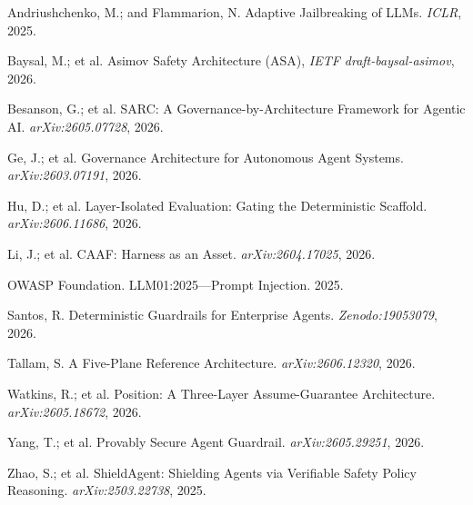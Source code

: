 \documentclass[letterpaper]{article} %
\begin{document}
\begin{thebibliography}{}

Andriushchenko, M.; and Flammarion, N.
Adaptive Jailbreaking of LLMs.  {\em ICLR}, 2025.

Baysal, M.; et al.
Asimov Safety Architecture (ASA), {\em IETF draft-baysal-asimov}, 2026.

Besanson, G.; et al.
SARC: A Governance-by-Architecture Framework for Agentic AI.
{\em arXiv:2605.07728}, 2026.

Ge, J.; et al.
Governance Architecture for Autonomous Agent Systems.
{\em arXiv:2603.07191}, 2026.

Hu, D.; et al.
Layer-Isolated Evaluation: Gating the Deterministic Scaffold.
{\em arXiv:2606.11686}, 2026.

Li, J.; et al.
CAAF: Harness as an Asset.  {\em arXiv:2604.17025}, 2026.

OWASP Foundation.  LLM01:2025---Prompt Injection.  2025.

Santos, R.  Deterministic Guardrails for Enterprise Agents.
{\em Zenodo:19053079}, 2026.

Tallam, S.  A Five-Plane Reference Architecture.
{\em arXiv:2606.12320}, 2026.

Watkins, R.; et al.
Position: A Three-Layer Assume-Guarantee Architecture.
{\em arXiv:2605.18672}, 2026.

Yang, T.; et al.
Provably Secure Agent Guardrail.  {\em arXiv:2605.29251}, 2026.

Zhao, S.; et al.
ShieldAgent: Shielding Agents via Verifiable Safety Policy Reasoning.
{\em arXiv:2503.22738}, 2025.

\end{thebibliography}
\end{document}

